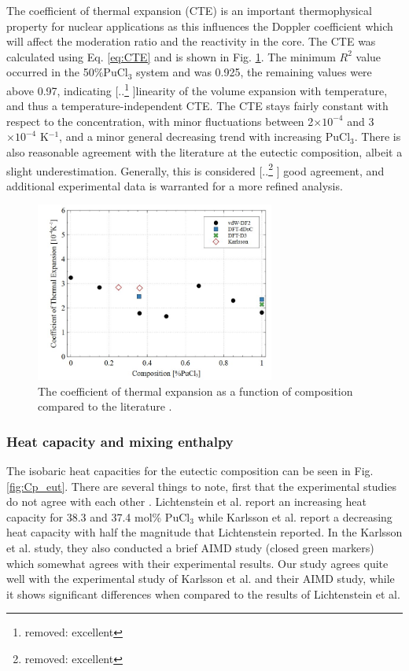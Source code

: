 \documentclass[review]{elsarticle}
\providecommand{\DIFaddtex}[1]{{\protect\color{blue} \sf #1}} %
\providecommand{\DIFdeltex}[1]{{\protect\color{red} [..\footnote{removed: #1} ]}} %
\providecommand{\DIFaddbegin}{} %
\providecommand{\DIFaddend}{} %
\providecommand{\DIFdelbegin}{} %
\providecommand{\DIFdelend}{} %
\providecommand{\DIFadd}[1]{\texorpdfstring{\DIFaddtex{#1}}{#1}} %
\providecommand{\DIFdel}[1]{\texorpdfstring{\DIFdeltex{#1}}{}} %
\newcommand{\DIFscaledelfig}{0.5}
\newlength{\DIFdelgraphicswidth} %
\newlength{\DIFdelgraphicsheight} %
\newcommand{\DIFaddincludegraphics}[2][]{{\color{blue}\fbox{\DIFOincludegraphics[#1]{#2}}}} %
\newcommand{\DIFdelincludegraphics}[2][]{%
\sbox{\DIFdelgraphicsbox}{\DIFOincludegraphics[#1]{#2}}%
\settoboxwidth{\DIFdelgraphicswidth}{\DIFdelgraphicsbox} %
\settoboxtotalheight{\DIFdelgraphicsheight}{\DIFdelgraphicsbox} %
\scalebox{\DIFscaledelfig}{%
\parbox[b]{\DIFdelgraphicswidth}{\usebox{\DIFdelgraphicsbox}\\[-\baselineskip] \rule{\DIFdelgraphicswidth}{0em}}\llap{\resizebox{\DIFdelgraphicswidth}{\DIFdelgraphicsheight}{%
\setlength{\unitlength}{\DIFdelgraphicswidth}%
\begin{picture}(1,1)%
\thicklines\linethickness{2pt} %
{\color[rgb]{1,0,0}\put(0,0){\framebox(1,1){}}}%
{\color[rgb]{1,0,0}\put(0,0){\line( 1,1){1}}}%
{\color[rgb]{1,0,0}\put(0,1){\line(1,-1){1}}}%
\end{picture}%
}\hspace*{3pt}}} %
} %
\DeclareRobustCommand{\DIFaddbegin}{\DIFOaddbegin \let\includegraphics\DIFaddincludegraphics} %
\DeclareRobustCommand{\DIFaddend}{\DIFOaddend \let\includegraphics\DIFOincludegraphics} %
\DeclareRobustCommand{\DIFdelbegin}{\DIFOdelbegin \let\includegraphics\DIFdelincludegraphics} %
\DeclareRobustCommand{\DIFdelend}{\DIFOaddend \let\includegraphics\DIFOincludegraphics} %
\begin{document}
The coefficient of thermal expansion (CTE) is an important thermophysical property for nuclear applications as this influences the Doppler coefficient which will affect the moderation ratio and the reactivity in the core. The CTE was calculated using Eq. \ref{eq:CTE} and is shown in Fig. \ref{fig:CTE}. The minimum $R^2$ value occurred in the 50\%PuCl$_3$ system and was 0.925, the remaining values were above 0.97, indicating \DIFdelbegin \DIFdel{excellent }\DIFdelend linearity of the volume expansion with temperature, and thus a temperature-independent CTE. The CTE stays fairly constant with respect to the concentration, with minor fluctuations between 2$\times10^{-4}$ and 3$\times10^{-4}$ K$^{-1}$, and a minor general decreasing trend with increasing PuCl$_3$. There is also reasonable agreement with the literature \cite{karlsson2022synthesis} at the eutectic composition, albeit a slight underestimation. Generally, this is considered \DIFdelbegin \DIFdel{excellent }\DIFdelend \DIFaddbegin \DIFadd{good }\DIFaddend agreement, and additional experimental data is warranted for a more refined analysis. 

\begin{figure}[h!]
 \centering
 \includegraphics[width=0.7\textwidth]{CTE.jpg} 
 \caption{The coefficient of thermal expansion as a function of composition compared to the literature \cite{karlsson2022synthesis}.}
 \label{fig:CTE}
\end{figure} 

\subsubsection{Heat capacity and mixing enthalpy}

The isobaric heat capacities for the eutectic composition can be seen in Fig. \ref{fig:Cp_eut}. There are several things to note, first that the experimental studies do not agree with each other \cite{karlsson2022synthesis, lichtenstein2022property}. Lichtenstein et al. report an increasing heat capacity for 38.3 and 37.4 mol\% PuCl$_3$ while Karlsson et al. report a decreasing heat capacity with half the magnitude that Lichtenstein reported. In the Karlsson et al. study, they also conducted a brief AIMD study (closed green markers) which somewhat agrees with their experimental results. Our study agrees quite well with the experimental study of Karlsson et al. and their AIMD study, while it shows significant differences when compared to the results of Lichtenstein et al.
\end{document}
